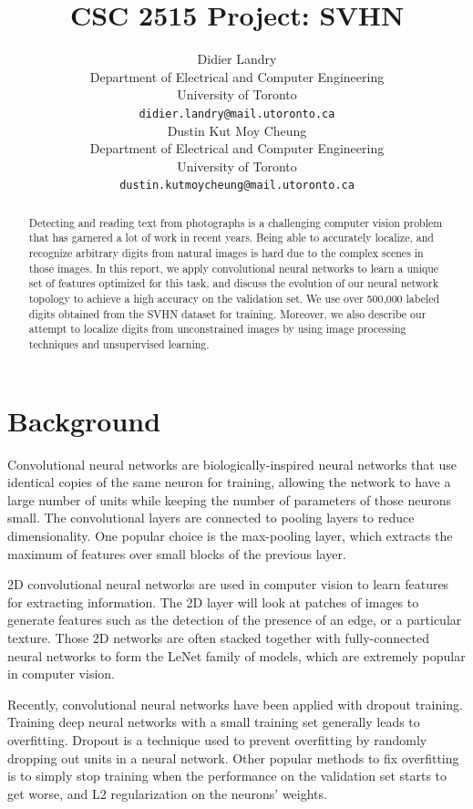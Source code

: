 \documentclass{article} %
\title{CSC 2515 Project: SVHN}
\author{
Didier Landry\\
Department of Electrical and Computer Engineering\\
University of Toronto\\
\texttt{didier.landry@mail.utoronto.ca} \\
\And
Dustin Kut Moy Cheung\\
Department of Electrical and Computer Engineering\\
University of Toronto\\
\texttt{dustin.kutmoycheung@mail.utoronto.ca} \\
}
\begin{document}
\maketitle

\begin{abstract}
Detecting and reading text from photographs is a challenging computer vision problem that has garnered a lot of work in recent years. Being able to accurately localize, and recognize arbitrary digits from natural images is hard due to the complex scenes in those images. In this report, we apply convolutional neural networks to learn a unique set of features optimized for this task, and discuss the evolution of our neural network topology to achieve a high accuracy on the validation set. We use over 500,000 labeled digits obtained from the SVHN\cite{svhn} dataset for training. Moreover, we also describe our attempt to localize digits from unconstrained images by using image processing techniques and unsupervised learning.
\end{abstract}

\section{Background}
Convolutional neural networks\cite{lecun_convolutional_svhn} are biologically-inspired neural networks that use identical copies of the same neuron for training, allowing the network to have a large number of units while keeping the number of parameters of those neurons small. The convolutional layers are connected to pooling layers to reduce dimensionality. One popular choice is the max-pooling layer, which extracts the maximum of features over small blocks of the previous layer.

2D convolutional neural networks are used in computer vision to learn features for extracting information. The 2D layer will look at patches of images to generate features such as the detection of the presence of an edge, or a particular texture. Those 2D networks are often stacked together with fully-connected neural networks to form the LeNet family of models, which are extremely popular in computer vision.

Recently, convolutional neural networks have been applied with dropout training\cite{dropout}. Training deep neural networks with a small training set generally leads to overfitting. Dropout is a technique used to prevent overfitting by randomly dropping out units in a neural network. Other popular methods to fix overfitting is to simply stop training when the performance on the validation set starts to get worse, and L2 regularization on the neurons' weights.
\end{document}
